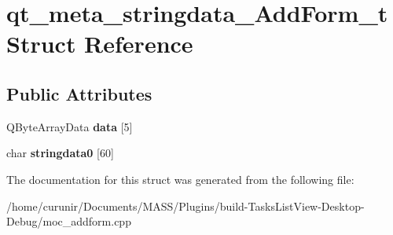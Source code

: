 \hypertarget{structqt__meta__stringdata___add_form__t}{}\section{qt\+\_\+meta\+\_\+stringdata\+\_\+\+Add\+Form\+\_\+t Struct Reference}
\label{structqt__meta__stringdata___add_form__t}
\subsection*{Public Attributes}
\begin{DoxyCompactItemize}
\item 
Q\+Byte\+Array\+Data {\bfseries data} \mbox{[}5\mbox{]}\hypertarget{structqt__meta__stringdata___add_form__t_a5317b1f7dd678ac9b7051a47219fc553}{}\label{structqt__meta__stringdata___add_form__t_a5317b1f7dd678ac9b7051a47219fc553}

\item 
char {\bfseries stringdata0} \mbox{[}60\mbox{]}\hypertarget{structqt__meta__stringdata___add_form__t_a4ee775790f14664c559536f017edb59f}{}\label{structqt__meta__stringdata___add_form__t_a4ee775790f14664c559536f017edb59f}

\end{DoxyCompactItemize}


The documentation for this struct was generated from the following file\+:\begin{DoxyCompactItemize}
\item 
/home/curunir/\+Documents/\+M\+A\+S\+S/\+Plugins/build-\/\+Tasks\+List\+View-\/\+Desktop-\/\+Debug/moc\+\_\+addform.\+cpp\end{DoxyCompactItemize}
